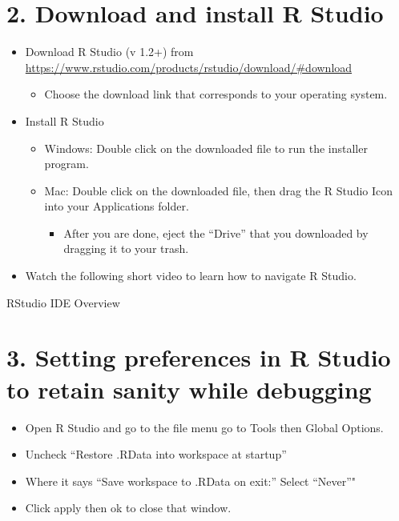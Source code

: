 \documentclass[]{article}
\providecommand{\tightlist}{%
  \setlength{\itemsep}{0pt}\setlength{\parskip}{0pt}}
\begin{document}
\hypertarget{download-and-install-r-studio}{%
\section{2. Download and install R
Studio}\label{download-and-install-r-studio}}

\begin{itemize}
\tightlist
\item
  Download R Studio (v 1.2+) from
  \url{https://www.rstudio.com/products/rstudio/download/\#download}

  \begin{itemize}
  \tightlist
  \item
    Choose the download link that corresponds to your operating system.
  \end{itemize}
\item
  Install R Studio

  \begin{itemize}
  \tightlist
  \item
    Windows: Double click on the downloaded file to run the installer
    program.
  \item
    Mac: Double click on the downloaded file, then drag the R Studio
    Icon into your Applications folder.

    \begin{itemize}
    \tightlist
    \item
      After you are done, eject the ``Drive'' that you downloaded by
      dragging it to your trash.
    \end{itemize}
  \end{itemize}
\item
  Watch the following short video to learn how to navigate R Studio.
\end{itemize}

RStudio IDE Overview

\hypertarget{setting-preferences-in-r-studio-to-retain-sanity-while-debugging}{%
\section{3. Setting preferences in R Studio to retain sanity while
debugging}\label{setting-preferences-in-r-studio-to-retain-sanity-while-debugging}}

\begin{itemize}
\tightlist
\item
  Open R Studio and go to the file menu go to Tools then Global Options.
\item
  Uncheck ``Restore .RData into workspace at startup''
\item
  Where it says ``Save workspace to .RData on exit:'' Select ``Never''"
\item
  Click apply then ok to close that window.
\end{itemize}
\end{document}
